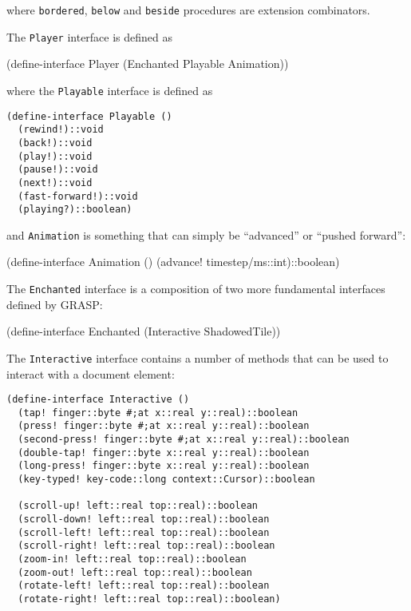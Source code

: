 \documentclass[acmsmall]{acmart}
\newenvironment{Snippet}{\Verbatim[samepage=true]}{\endVerbatim}
\begin{document}
where \texttt{bordered}, \texttt{below} and \texttt{beside} procedures
are extension combinators.

The \texttt{Player} interface is defined as

\begin{Snippet}
(define-interface Player (Enchanted Playable Animation))
\end{Snippet}

where the \texttt{Playable} interface is defined as

\begin{verbatim}
(define-interface Playable ()
  (rewind!)::void
  (back!)::void
  (play!)::void
  (pause!)::void
  (next!)::void
  (fast-forward!)::void
  (playing?)::boolean)
\end{verbatim}

and \texttt{Animation} is something that can simply be ``advanced'' or
``pushed forward'':

\begin{Snippet}
(define-interface Animation ()
  (advance! timestep/ms::int)::boolean)
\end{Snippet}

The \texttt{Enchanted} interface is a composition of two more
fundamental interfaces defined by GRASP:

\begin{Snippet}
(define-interface Enchanted (Interactive ShadowedTile))
\end{Snippet}

The \texttt{Interactive} interface contains a number of methods that
can be used to interact with a document element:

\begin{verbatim}
(define-interface Interactive ()
  (tap! finger::byte #;at x::real y::real)::boolean
  (press! finger::byte #;at x::real y::real)::boolean
  (second-press! finger::byte #;at x::real y::real)::boolean
  (double-tap! finger::byte x::real y::real)::boolean
  (long-press! finger::byte x::real y::real)::boolean
  (key-typed! key-code::long context::Cursor)::boolean

  (scroll-up! left::real top::real)::boolean
  (scroll-down! left::real top::real)::boolean
  (scroll-left! left::real top::real)::boolean
  (scroll-right! left::real top::real)::boolean
  (zoom-in! left::real top::real)::boolean
  (zoom-out! left::real top::real)::boolean
  (rotate-left! left::real top::real)::boolean
  (rotate-right! left::real top::real)::boolean)
\end{verbatim}
\end{document}
